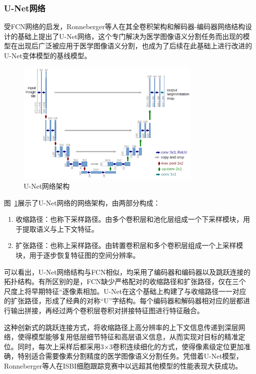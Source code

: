 \subsubsection{U-Net网络}

受FCN网络的启发，Ronneberger等人在其全卷积架构和解码器-编码器网络结构设计的基础上提出了U-Net网络，这个专门解决为医学图像语义分割任务而出现的模型在出现后广泛被应用于医学图像语义分割，也成为了后续在此基础上进行改进的U-Net变体模型的基线模型。

\begin{figure}[htbp]
    \centering
    \includegraphics[width=0.8\textwidth]{fig/u-net-architecture.png}
    \caption{U-Net网络架构\cite{ronneberger2015}}
    \label{fig:unet_frame}
\end{figure}

图~\ref{fig:unet_frame}展示了U-Net网络的网络架构，由两部分构成：

\begin{enumerate}
    \item 收缩路径：也称下采样路径。由多个卷积层和池化层组成一个下采样模块，用于提取语义与上下文特征。
    \item 扩张路径：也称上采样路径。由转置卷积层和多个卷积层组成一个上采样模块，用于逐步恢复特征图的空间分辨率。
\end{enumerate}

可以看出，U-Net网络结构与FCN相似，均采用了编码器和编码器以及跳跃连接的拓扑结构。有所区别的是，FCN缺少严格配对的收缩路径和扩张路径，仅在三个尺度上将早期特征“逐像素相加。U-Net在这个基础上构建了与收缩路径一一对应的扩张路径，形成了经典的对称“U”字结构。每个编码器和解码器相对应的层都进行输出拼接，再经过两个卷积层卷积对拼接特征图进行特征融合。

这种创新式的跳跃连接方式，将收缩路径上高分辨率的上下文信息传递到深层网络，使得模型能够复用低层细节特征和高层语义信息，从而实现对目标的精准定位。同时，每次上采样后都采用3×3卷积连续细化的方式，使得像素级定位更加准确，特别适合需要像素分割精度的医学图像语义分割任务。凭借着U-Net模型，Ronneberger等人在ISBI细胞跟踪竞赛中以远超其他模型的性能表现大获成功\cite{ronneberger2015}。
